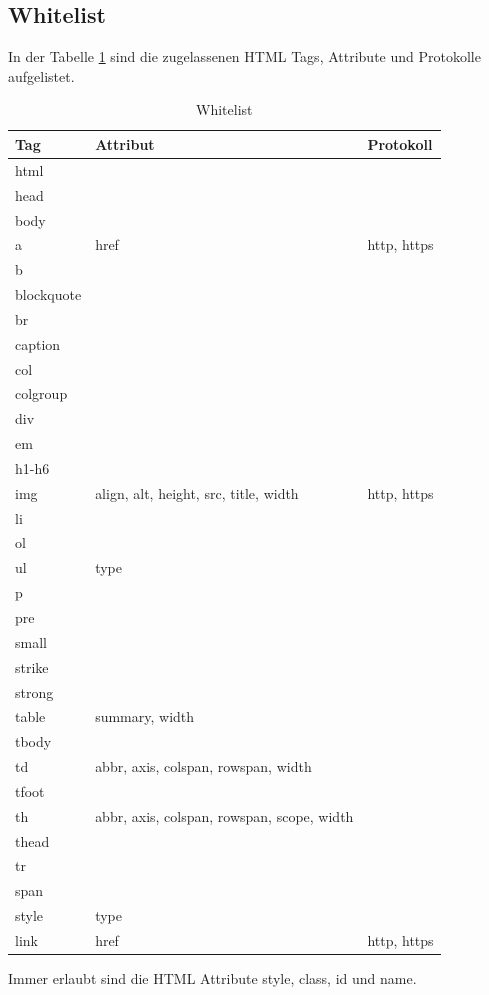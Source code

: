 \subsection{Whitelist}
In der Tabelle \ref{tab:whitelist} sind die zugelassenen HTML Tags, Attribute und Protokolle aufgelistet.
\begin{table}[H]
\begin{center}
\begin{tabular}{l l l}
\hline
\textbf{Tag} & \textbf{Attribut} & \textbf{Protokoll} \\ \hline \hline
html & & \\ 
head & & \\ 
body & & \\ 
a & href & http, https \\ 
b & & \\ 
blockquote & & \\ 
br & & \\ 
caption & & \\ 
col & & \\ 
colgroup & & \\ 
div & & \\ 
em & & \\ 
h1-h6 & & \\
img & align, alt, height, src, title, width & http, https \\ 
li & & \\  
ol & & \\  
ul & type & \\  
p & & \\  
pre & & \\  
small & & \\  
strike & & \\  
strong & & \\  
table & summary, width & \\  
tbody & & \\  
td & abbr, axis, colspan, rowspan, width & \\  
tfoot & & \\  
th & abbr, axis, colspan, rowspan, scope, width & \\  
thead & & \\  
tr & & \\  
span & & \\  
style & type & \\  
link & href & http, https \\
\hline \hline
\end{tabular}
\caption{Whitelist}
\label{tab:whitelist}
\end{center}
\end{table}

Immer erlaubt sind die HTML Attribute style, class, id und name.
